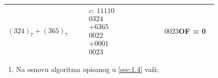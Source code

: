 \documentclass[a4paper,11pt]{article}
\numberwithin{equation}{section}
\newcommand{\redlinija}{\arrayrulecolor{black!28}\specialrule{0.3pt}{2pt}{2pt}\arrayrulecolor{black}}
\begin{document}
\begin{longtable}{p{0.34\linewidth} p{0.34\linewidth} p{0.23\linewidth}}
\redlinija
$(324)_{7}+(365)_{7}$ & $\begin{array}{r}c:\ 11110\\0324\\+6365\\\hline 0022\\+0001\\\hline 0023\end{array}$ & $0023$\newline OF = 0\\[5pt]
\bottomrule\end{longtable}


\begin{enumerate}[label=\alph*),start=2,leftmargin=*]
\item Na osnovu algoritma opisanog u \ref{sec:1.4} važi:

\end{enumerate}
\end{document}
